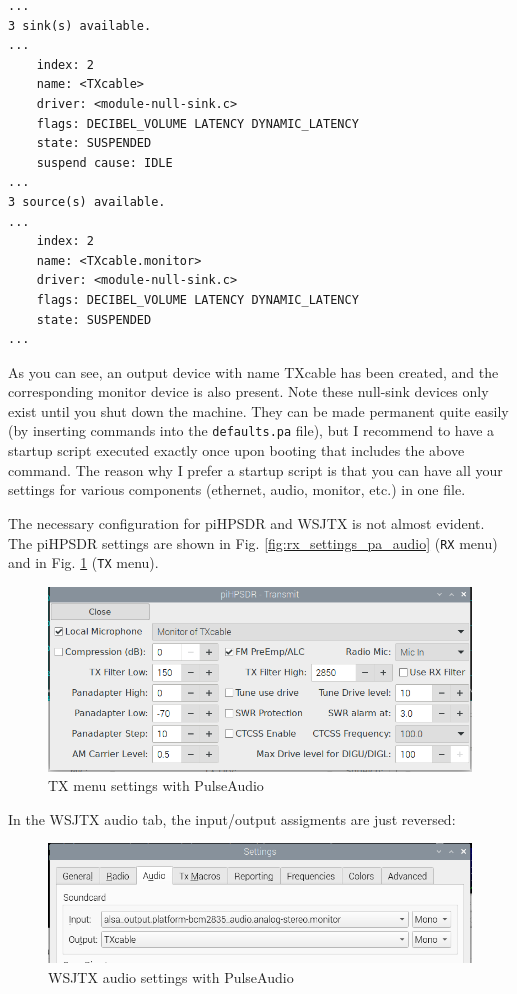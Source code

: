 \documentclass[12pt]{book}
\def\bltt#1{\texttt{\color{blue}#1}}
\begin{document}
\begin{small}
\begin{verbatim}
...
3 sink(s) available.
...
    index: 2
	name: <TXcable>
	driver: <module-null-sink.c>
	flags: DECIBEL_VOLUME LATENCY DYNAMIC_LATENCY
	state: SUSPENDED
	suspend cause: IDLE
...
3 source(s) available.
...
    index: 2
	name: <TXcable.monitor>
	driver: <module-null-sink.c>
	flags: DECIBEL_VOLUME LATENCY DYNAMIC_LATENCY
	state: SUSPENDED
...
\end{verbatim}
\end{small}

As you can see, an output device with name TXcable has been created, and the corresponding
monitor device is also present. Note these null-sink devices only exist until you shut
down the machine. They can be made permanent quite easily (by inserting commands into
the \texttt{defaults.pa} file), but I recommend to have a startup script executed
exactly once upon booting that includes the above command. The reason why I prefer a startup
script is that you can have all your settings for various components (ethernet, audio,
monitor, etc.) in one file.

The necessary configuration for piHPSDR and WSJTX is not almost evident. The
piHPSDR settings are shown in Fig. \ref{fig:rx_settings_pa_audio} (\bltt{RX} menu)
and in Fig. \ref{fig:tx_settings_pa_audio} (\bltt{TX} menu).



\begin{figure}[ht]
\center
\includegraphics[width=12cm]{tx_settings_pa_audio.png}
\caption{TX menu settings with PulseAudio}
\label{fig:tx_settings_pa_audio}
\end{figure}

In the WSJTX audio tab, the input/output assigments are just reversed:

\begin{figure}[ht]
\center
\includegraphics[width=12cm]{wsjtx_settings_pa_audio.png}
\caption{WSJTX audio settings with PulseAudio}
\label{fig:wstx_settings_pa_audio}
\end{figure}
\end{document}

